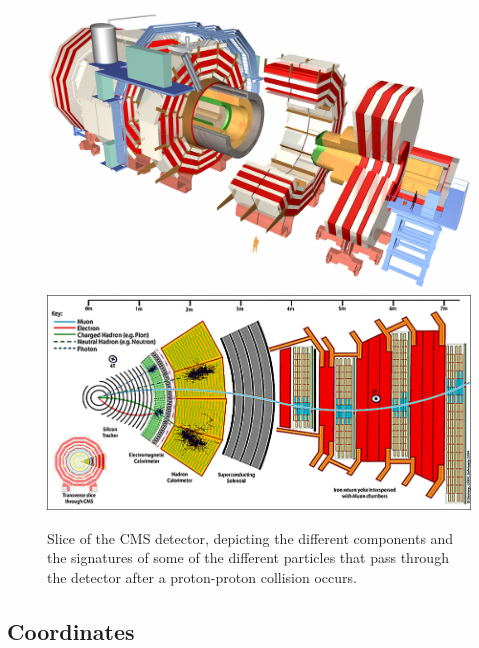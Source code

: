\begin{figure}[h!]
    \centering
        \includegraphics[width=\textwidth]{F3/CMSnc}
        \includegraphics[width=\textwidth]{F3/cms_slice}
        \caption{Slice of the CMS detector, depicting the different components and the signatures of some of the different particles that pass through the detector after a proton-proton collision occurs.}
        \label{Fig:CMS:Slice}
\end{figure}

\vspace{5mm}
\subsection{Coordinates}

